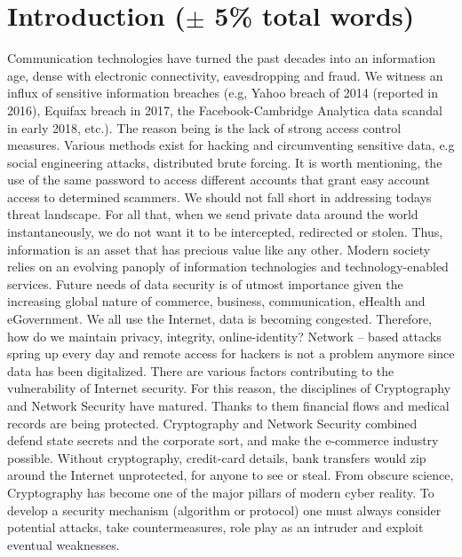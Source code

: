 \section{Introduction ($\pm$ 5\% total words)}
Communication technologies have turned the past decades into an information age, dense with electronic connectivity, eavesdropping and fraud. We witness an influx of sensitive information breaches (e.g, Yahoo breach of 2014 (reported in 2016), Equifax breach in 2017, the Facebook-Cambridge Analytica data scandal in early 2018, etc.). The reason being is the lack of strong access control measures. Various methods exist for hacking and circumventing sensitive data, e.g social engineering attacks, distributed brute forcing. It is worth mentioning, the use of the same password to access different accounts that grant easy account access to determined scammers. We should not fall short in addressing todays threat landscape. For all that, when we send private data around the world instantaneously, we do not want it to be intercepted, redirected or stolen. Thus, information is an asset that has precious value like any other. Modern society relies on an evolving panoply of information technologies and technology-enabled services. Future needs of data security is of utmost importance given the increasing global nature of commerce, business, communication, eHealth and eGovernment. We all use the Internet, data is becoming congested. Therefore, how do we maintain privacy, integrity, online-identity? Network – based attacks spring up every day and remote access for hackers is not a problem anymore since data has been digitalized. There are various factors contributing to the vulnerability of Internet security. For this reason, the disciplines of Cryptography and Network Security have matured. Thanks to them financial flows and medical records are being protected. Cryptography and Network Security combined defend state secrets and the corporate sort, and make the e-commerce industry possible. Without cryptography, credit-card details, bank transfers would zip around the Internet unprotected, for anyone to see or steal. From obscure science, Cryptography has become one of the major pillars of modern cyber reality. To develop a security mechanism (algorithm or protocol) one must always consider potential attacks, take countermeasures, role play as an intruder and exploit eventual weaknesses.

